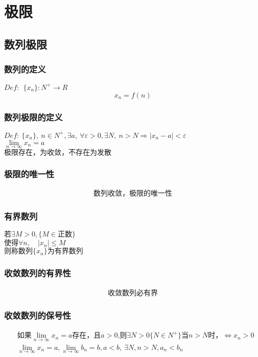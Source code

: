 \section{极限}
\subsection{数列极限}
\subsubsection{数列的定义}
$Def:\ \ \{x_n\}: N^+\rightarrow R $
$$x_n = f(n)$$
\subsubsection{数列极限的定义}
$Def:\ \{x_n\},\ n\in N^+,\exists  a,\ \forall\varepsilon>0,\exists N,\ n>N\Rightarrow \left|x_n-a\right|<\varepsilon$\\
$\lim\limits_{n \to \infty}{x_n}=a$\\ 
$\mbox{极限存在，为收敛，不存在为发散}$
\subsubsection{极限的唯一性}
\begin{align}
\mbox{数列收敛，极限的唯一性}\label{limit_sequence}
\end{align}
\subsubsection{有界数列}
$\mbox{若}\exists M>0,\{M\in\mbox{正数}\}$\\
$\mbox{使得}\forall n,\quad\left|x_n\right|\leqslant M$\\
$\mbox{则称数列$\{x_n\}$为有界数列}$
\subsubsection{收敛数列的有界性}
\begin{align}
    \mbox{收敛数列必有界}\label{sequence_bounded}
\end{align}
\subsubsection{收敛数列的保号性}
\begin{align}
   &\mbox{如果$\lim\limits_{n \to\infty}x_n=a$存在，且$a>0$,则$\exists N>0\{N\in N^+\}$当$n>N$时，$\Leftrightarrow x_n>0$}\label{Serial_number_preservation_a}\\
    &\lim\limits_{n\to\infty}x_n=a,\lim\limits_{n\to\infty}b_n=b,a<b,\ \exists N,n>N,a_n<b_n \label{Serial_number_preservation_b}
\end{align}

